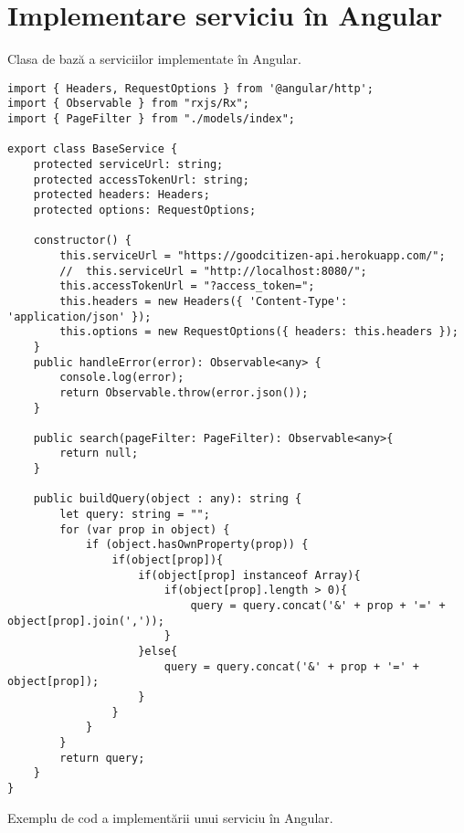 \section{Implementare serviciu în Angular}

Clasa de bază a serviciilor implementate în Angular.
\begin {lstlisting}
import { Headers, RequestOptions } from '@angular/http';
import { Observable } from "rxjs/Rx";
import { PageFilter } from "./models/index";

export class BaseService {
    protected serviceUrl: string;
    protected accessTokenUrl: string;
    protected headers: Headers;
    protected options: RequestOptions;

    constructor() {
        this.serviceUrl = "https://goodcitizen-api.herokuapp.com/";
        //  this.serviceUrl = "http://localhost:8080/";
        this.accessTokenUrl = "?access_token=";
        this.headers = new Headers({ 'Content-Type': 'application/json' });
        this.options = new RequestOptions({ headers: this.headers });
    }
    public handleError(error): Observable<any> {
        console.log(error);
        return Observable.throw(error.json());
    }

    public search(pageFilter: PageFilter): Observable<any>{
        return null;
    } 

    public buildQuery(object : any): string {
        let query: string = "";
        for (var prop in object) {
            if (object.hasOwnProperty(prop)) {
                if(object[prop]){
                    if(object[prop] instanceof Array){
                        if(object[prop].length > 0){
                            query = query.concat('&' + prop + '=' + object[prop].join(','));
                        }
                    }else{
                        query = query.concat('&' + prop + '=' + object[prop]);
                    }
                }
            }
        }
        return query;
    }
}
\end{lstlisting}
Exemplu de cod a implementării unui serviciu în Angular.
